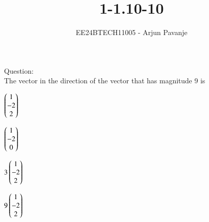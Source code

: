 \documentclass[journal]{IEEEtran}
\begin{document}

\vspace{3cm}

\title{1-1.10-10}
\author{EE24BTECH11005 - Arjun Pavanje
}
{\let\newpage\relax\maketitle}
Question:\\
The vector in the direction of the vector  that has magnitude 9 is
\begin{enumerate}
\begin{multicols}{2}
\item $\begin{pmatrix}1\\-2\\2\end{pmatrix}$
\columnbreak
\item $\begin{pmatrix}1\\-2\\0\end{pmatrix}$
\end{multicols}
\begin{multicols}{2}
	\item $3\begin{pmatrix}1\\-2\\2\end{pmatrix}$
\columnbreak
\item $9\begin{pmatrix}1\\-2\\2\end{pmatrix}$
\end{multicols}
\end{enumerate}
\end{document}

